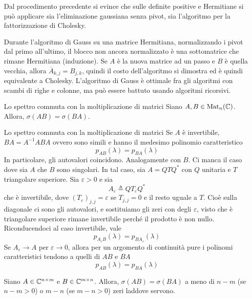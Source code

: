 \documentclass[a4paper]{article}
\begin{document}
Dal procedimento precedente si evince che sulle definite positive e Hermitiane
si può applicare sia l'eliminazione gaussiana senza pivot, sia
l'algoritmo per la fattorizzazione di Cholesky.

Durante l'algoritmo di Gauss su una matrice Hermitiana,
normalizzando i pivot dal primo all'ultimo,
il blocco non ancora normalizzato è una sottomatrice che rimane Hermitiana (induzione).
Se \(A\) è la nuova matrice ad un passo e \(B\) è quella vecchia, allora \(\overline A_{k,j} = B_{j,k}\),
quindi il costo dell'algoritmo si dimostra ed è quindi equivalente a Cholesky.
L'algoritmo di Gauss è ottimale fra gli algoritmi con scambi di righe e colonne, ma può essere battuto usando
algoritmi ricorsivi.

\pagebreak

\begin{snippettheorem}{Lo spettro commuta con la moltiplicazione di matrici}
    Siano \(A,B \in \operatorname{Mat}_n(\mathbb{C})\).
    Allora, \(\sigma(AB) = \sigma(BA)\).
\end{snippettheorem}

\begin{snippetproof}{Lo spettro commuta con la moltiplicazione di matrici}
    Se \(A\) è invertibile, \(BA = A^{-1}ABA\) ovvero sono simili e hanno
    il medesimo polinomio caratteristico
    \[
        p_{AB}(\lambda) = p_{BA}(\lambda)
    \]
    In particolare, gli autovalori coincidono.
    Analogamente con \(B\). Ci manca il caso dove sia \(A\) che \(B\)
    sono singolari. In tal caso,
    sia \(A = QTQ^*\) con \(Q\) unitaria e \(T\) triangolare superiore.
    Sia \(\varepsilon > 0\) e sia
    \[
        A_\varepsilon \triangleq QT_\varepsilon Q^*
    \]
    che è invertibile, dove
    \((T_{\varepsilon})_{j,j} = \varepsilon\) se \(T_{j,j} = 0\)
    e il resto uguale a \(T\).
    Cioè sulla diagonale ci sono gli autovalori, e sostituiamo gli zeri con degli \(\varepsilon\),
    visto che è triangolare superiore rimane invertibile perché il prodotto è non nullo.
    Riconducendoci al caso invertibile, vale
    \[
        p_{A_\varepsilon B}(\lambda) = p_{BA_\varepsilon}(\lambda)
    \]
    Se \(A_\varepsilon \to A\) per \(\varepsilon \to 0\), allora per un argomento di continuità
    pure i polinomi caratteristici tendono a quelli di \(AB\) e \(BA\)
    \[
        p_{AB}(\lambda) = p_{BA}(\lambda)
    \]
\end{snippetproof}

\begin{snippettheorem}{}
    Siano \(A \in \mathbb{C}^{n \times m}\) e \(B \in \mathbb{C}^{m \times n}\).
    Allora, \(\sigma(AB) = \sigma(BA)\) a meno di \(n-m\) (se \(n-m > 0\))
    o \(m-n\) (se \(m-n > 0\)) zeri laddove servono.
\end{snippettheorem}
\end{document}
